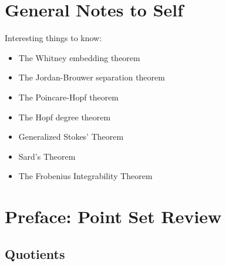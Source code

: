 \newpage
\tableofcontents

\hypertarget{general-notes-to-self}{%
\section{General Notes to Self}\label{general-notes-to-self}}

Interesting things to know:

\begin{itemize}
\tightlist
\item
  The Whitney embedding theorem
\item
  The Jordan-Brouwer separation theorem
\item
  The Poincare-Hopf theorem
\item
  The Hopf degree theorem
\item
  Generalized Stokes' Theorem
\item
  Sard's Theorem
\item
  The Frobenius Integrability Theorem
\end{itemize}

\hypertarget{preface-point-set-review}{%
\section{Preface: Point Set Review}\label{preface-point-set-review}}

\hypertarget{quotients}{%
\subsection{Quotients}\label{quotients}}

